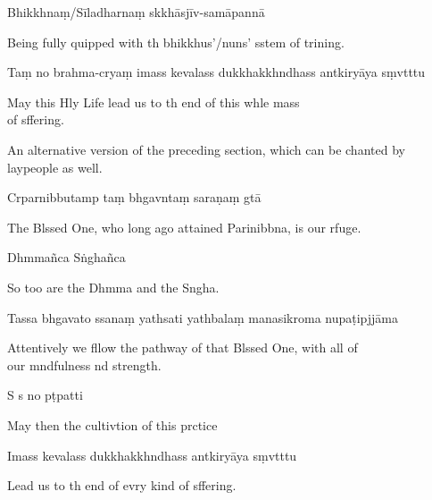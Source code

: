 Bhikkhnaṃ/Sīladharnaṃ skkhāsjīv-samāpannā

\begin{english}
  Being fully quipped with th bhikkhus'/nuns' sstem of trining.
\end{english}

Taṃ no brahma-cryaṃ imass kevalass dukkhakkhndhass antkiryāya sṃvtttu

\begin{english}
  May this Hly Life lead us to th end of this whle mass \\of sffering.
\end{english}

\begin{instruction}
  An alternative version of the preceding section, which can be chanted by laypeople as well.
\end{instruction}

Crparnibbutamp taṃ bhgavntaṃ saraṇaṃ gtā

\begin{english}
  The Blssed One, who long ago attained Parinibbna, is our rfuge.
\end{english}

Dhmmañca Sṅghañca

\begin{english}
  So too are the Dhmma and the Sngha.
\end{english}

Tassa bhgavato ssanaṃ yathsati yathbalaṃ manasikroma nupaṭipjjāma

\begin{english}
  Attentively we fllow the pathway of that Blssed One, with all of \\our mndfulness nd strength.
\end{english}

S s no pṭpatti

\begin{english}
  May then the cultivtion of this prctice
\end{english}

Imass kevalass dukkhakkhndhass antkiryāya sṃvtttu

\begin{english}
  Lead us to th end of evry kind of sffering.
\end{english}

